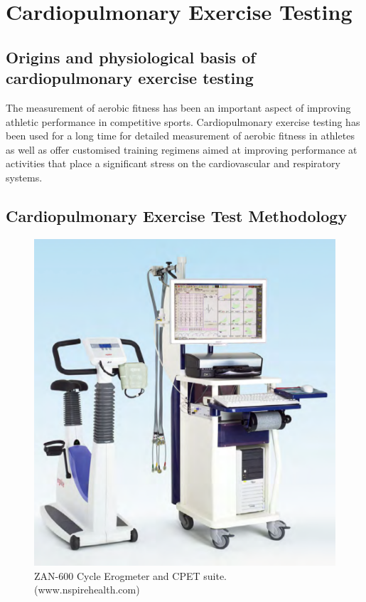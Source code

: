 \section{Cardiopulmonary Exercise Testing}

\subsection{Origins and physiological basis of cardiopulmonary exercise testing}
The measurement of aerobic fitness has been an important aspect of improving athletic performance in competitive sports. Cardiopulmonary exercise testing has been used for a long time for detailed measurement of aerobic fitness in athletes as well as offer customised training regimens aimed at improving performance at activities that place a significant stress on the cardiovascular and respiratory systems.


\subsection{Cardiopulmonary Exercise Test Methodology}
\label{sec:cpx_method}

\begin{figure}[htbp]
	\centering
	\includegraphics[width=\textwidth]{Figures/cpet-zan}
	\caption{ZAN-600 Cycle Erogmeter and CPET suite. (www.nspirehealth.com)}
	\label{fig:cpet-zan}
\end{figure}

